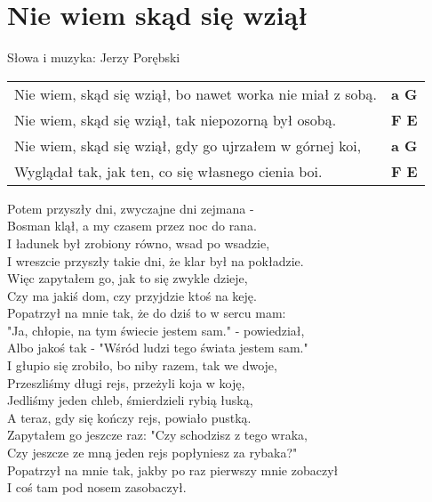 \section{Nie wiem skąd się wziął}

Słowa i muzyka: Jerzy Porębski

\vspace{2em}
\begin{tabular}{@{}p{10cm}@{}l@{}}
Nie wiem, skąd się wziął, bo nawet worka nie miał z sobą. & \bfseries a G\\
Nie wiem, skąd się wziął, tak niepozorną był osobą. & \bfseries F E\\
Nie wiem, skąd się wziął, gdy go ujrzałem w górnej koi, & \bfseries a G\\
Wyglądał tak, jak ten, co się własnego cienia boi. & \bfseries F E\\
\end{tabular}

\vspace{1em}
Potem przyszły dni, zwyczajne dni zejmana - \\
Bosman klął, a my czasem przez noc do rana. \\
I ładunek był zrobiony równo, wsad po wsadzie, \\
I wreszcie przyszły takie dni, że klar był na pokładzie. \\

Więc zapytałem go, jak to się zwykle dzieje, \\
Czy ma jakiś dom, czy przyjdzie ktoś na keję. \\
Popatrzył na mnie tak, że do dziś to w sercu mam: \\
"Ja, chłopie, na tym świecie jestem sam." - powiedział, \\
Albo jakoś tak - "Wśród ludzi tego świata jestem sam." \\

I głupio się zrobiło, bo niby razem, tak we dwoje, \\
Przeszliśmy długi rejs, przeżyli koja w koję, \\
Jedliśmy jeden chleb, śmierdzieli rybią łuską, \\
A teraz, gdy się kończy rejs, powiało pustką. \\

Zapytałem go jeszcze raz: "Czy schodzisz z tego wraka, \\
Czy jeszcze ze mną jeden rejs popłyniesz za rybaka?" \\
Popatrzył na mnie tak, jakby po raz pierwszy mnie zobaczył \\
I coś tam pod nosem zasobaczył. \\
\newpage

